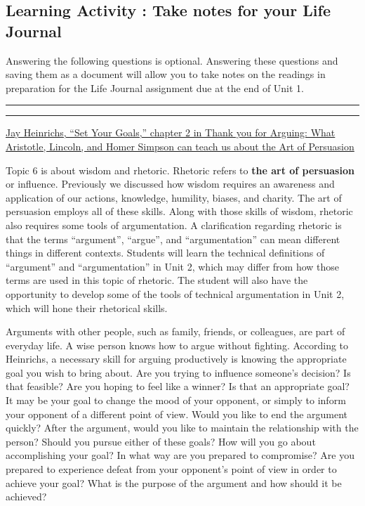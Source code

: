 \documentclass[
]{book}
\begin{document}
\hypertarget{learning-activity-take-notes-for-your-life-journal-4}{%
\subsection{Learning Activity : Take notes for your Life Journal}\label{learning-activity-take-notes-for-your-life-journal-4}}

Answering the following questions is optional. Answering these questions and saving them as a document will allow you to take notes on the readings in preparation for the Life Journal assignment due at the end of Unit 1.

\begin{center}\rule{0.5\linewidth}{0.5pt}\end{center}

\begin{center}\rule{0.5\linewidth}{0.5pt}\end{center}

\href{assets/u1/PAT-10018663_Thank_you_for.pdf}{Jay Heinrichs, ``Set Your Goals,'' chapter 2 in Thank you for Arguing: What Aristotle, Lincoln, and Homer Simpson can teach us about the Art of Persuasion}

Topic 6 is about wisdom and rhetoric. Rhetoric refers to \textbf{the art of persuasion} or influence. Previously we discussed how wisdom requires an awareness and application of our actions, knowledge, humility, biases, and charity. The art of persuasion employs all of these skills. Along with those skills of wisdom, rhetoric also requires some tools of argumentation. A clarification regarding rhetoric is that the terms ``argument'', ``argue'', and ``argumentation'' can mean different things in different contexts. Students will learn the technical definitions of ``argument'' and ``argumentation'' in Unit 2, which may differ from how those terms are used in this topic of rhetoric. The student will also have the opportunity to develop some of the tools of technical argumentation in Unit 2, which will hone their rhetorical skills.

Arguments with other people, such as family, friends, or colleagues, are part of everyday life. A wise person knows how to argue without fighting. According to Heinrichs, a necessary skill for arguing productively is knowing the appropriate goal you wish to bring about. Are you trying to influence someone's decision? Is that feasible? Are you hoping to feel like a winner? Is that an appropriate goal? It may be your goal to change the mood of your opponent, or simply to inform your opponent of a different point of view. Would you like to end the argument quickly? After the argument, would you like to maintain the relationship with the person? Should you pursue either of these goals? How will you go about accomplishing your goal? In what way are you prepared to compromise? Are you prepared to experience defeat from your opponent's point of view in order to achieve your goal? What is the purpose of the argument and how should it be achieved?
\end{document}
